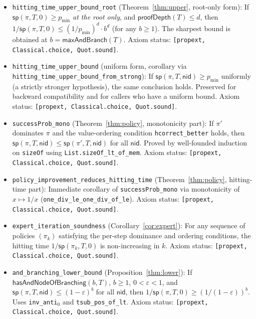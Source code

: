\documentclass[reqno,11pt]{amsart}
\newcommand{\sP}{\mathsf{sp}}
\newcommand{\maxAnd}{\mathsf{maxAndBranch}}
\newcommand{\proofDepth}{\mathsf{proofDepth}}
\newcommand{\nid}{\mathsf{nid}}
\newcommand{\hasAnd}{\mathsf{hasAndNodeOfBranching}}
\newcommand{\lean}[1]{\textup{\texttt{\small #1}}}
\theoremstyle{plain}
\theoremstyle{definition}
\theoremstyle{remark}
\begin{document}
\begin{itemize}[leftmargin=*, itemsep=4pt]
\item \lean{hitting\_time\_upper\_bound\_root} (Theorem~\ref{thm:upper}, root-only form): If $\sP(\pi, T, 0) \ge p_{\min}$ \emph{at the root only}, and $\proofDepth(T) \le d$, then $1/\sP(\pi,T,0) \le (1/p_{\min})^d \cdot b^d$ (for any $b \ge 1$). The sharpest bound is obtained at $b = \maxAnd(T)$.
  Axiom status: \texttt{[propext, Classical.choice, Quot.sound]}.

\item \lean{hitting\_time\_upper\_bound} (uniform form, corollary via \lean{hitting\_time\_upper\_bound\_from\_strong}): If $\sP(\pi, T, \nid) \ge p_{\min}$ uniformly (a strictly stronger hypothesis), the same conclusion holds. Preserved for backward compatibility and for callers who have a uniform bound.
  Axiom status: \texttt{[propext, Classical.choice, Quot.sound]}.

\item \lean{successProb\_mono} (Theorem~\ref{thm:policy}, monotonicity part): If $\pi'$ dominates $\pi$ and the value-ordering condition \texttt{hcorrect\_better} holds, then $\sP(\pi,T,\nid) \le \sP(\pi',T,\nid)$ for all $\nid$. Proved by well-founded induction on \texttt{sizeOf} using \texttt{List.sizeOf\_lt\_of\_mem}.
  Axiom status: \texttt{[propext, Classical.choice, Quot.sound]}.

\item \lean{policy\_improvement\_reduces\_hitting\_time} (Theorem~\ref{thm:policy}, hitting-time part): Immediate corollary of \lean{successProb\_mono} via monotonicity of $x \mapsto 1/x$ (\texttt{one\_div\_le\_one\_div\_of\_le}).
  Axiom status: \texttt{[propext, Classical.choice, Quot.sound]}.

\item \lean{expert\_iteration\_soundness} (Corollary~\ref{cor:expert}): For any sequence of policies $(\pi_k)$ satisfying the per-step dominance and ordering conditions, the hitting time $1/\sP(\pi_k, T, 0)$ is non-increasing in $k$.
  Axiom status: \texttt{[propext, Classical.choice, Quot.sound]}.

\item \lean{and\_branching\_lower\_bound} (Proposition~\ref{thm:lower}): If $\hasAnd(b, T)$, $b \ge 1$, $0 < \varepsilon < 1$, and $\sP(\pi, T, \nid) \le (1-\varepsilon)^b$ for all $\nid$, then $1/\sP(\pi, T, 0) \ge (1/(1-\varepsilon))^b$. Uses \texttt{inv\_anti$_0$} and \texttt{tsub\_pos\_of\_lt}.
  Axiom status: \texttt{[propext, Classical.choice, Quot.sound]}.


\end{itemize}
\end{document}
